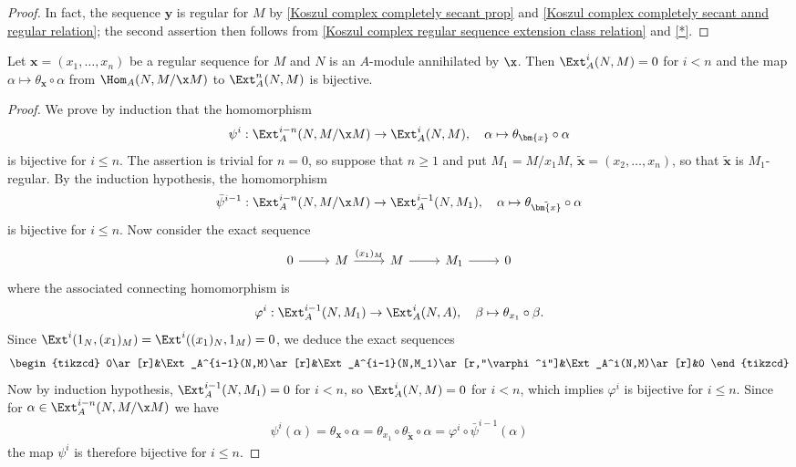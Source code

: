 \begin{proof}
In fact, the sequence $\bm{y}$ is regular for $M$ by \cref{Koszul complex completely secant prop} and \cref{Koszul complex completely secant annd regular relation}; the second assertion then follows from \cref{Koszul complex regular sequence extension class relation} and \cref{*}.
\end{proof}
\begin{proposition}\label{Koszul complex regular sequence extension class and Hom prop}
Let $\bm{x}=(x_1,\dots,x_n)$ be a regular sequence for $M$ and $N$ is an $A$-module annihilated by $\x$. Then $\Ext_A^i(N,M)=0$ for $i<n$ and the map $\alpha\mapsto\theta_{\bm{x}}\circ\alpha$ from $\Hom_A(N,M/\x M)$ to $\Ext_A^n(N,M)$ is bijective.
\end{proposition}
\begin{proof}
We prove by induction that the homomorphism
\[\psi^i:\Ext_A^{i-n}(N,M/\x M)\to\Ext_A^i(N,M),\quad\alpha\mapsto\theta_{\bm{x}}\circ\alpha\]
is bijective for $i\leq n$. The assertion is trivial for $n=0$, so suppose that $n\geq 1$ and put $M_1=M/x_1M$, $\tilde{\bm{x}}=(x_2,\dots,x_n)$, so that $\tilde{\bm{x}}$ is $M_1$-regular. By the induction hypothesis, the homomorphism
\[\bar{\psi}^{i-1}:\Ext_A^{i-n}(N,M/\x M)\to\Ext_A^{i-1}(N,M_1),\quad \alpha\mapsto\theta_{\tilde{\bm{x}}}\circ\alpha\]
is bijective for $i\leq n$. Now consider the exact sequence
\[\begin{tikzcd}
0\ar[r]&M\ar[r,"(x_1)_M"]&M\ar[r]&M_1\ar[r]&0
\end{tikzcd}\]
where the associated connecting homomorphism is
\[\varphi^i:\Ext_A^{i-1}(N,M_1)\to\Ext_A^i(N,A),\quad \beta\mapsto\theta_{x_1}\circ\beta.\]
Since $\Ext^i(1_N,(x_1)_M)=\Ext^i((x_1)_N,1_M)=0$, we deduce the exact sequences
\[\begin{tikzcd}
0\ar[r]&\Ext_A^{i-1}(N,M)\ar[r]&\Ext_A^{i-1}(N,M_1)\ar[r,"\varphi^i"]&\Ext_A^i(N,M)\ar[r]&0
\end{tikzcd}\]
Now by induction hypothesis, $\Ext_A^{i-1}(N,M_1)=0$ for $i<n$, so $\Ext_A^i(N,M)=0$ for $i<n$, which implies $\varphi^i$ is bijective for $i\leq n$. Since for $\alpha\in\Ext_A^{i-n}(N,M/\x M)$ we have
\begin{align}\label{Koszul complex regular sequence extension class and Hom prop-1}
\psi^i(\alpha)=\theta_{\bm{x}}\circ\alpha=\theta_{x_1}\circ\theta_{\tilde{\bm{x}}}\circ\alpha=\varphi^i\circ\bar{\psi}^{i-1}(\alpha)
\end{align}
the map $\psi^i$ is therefore bijective for $i\leq n$.
\end{proof}